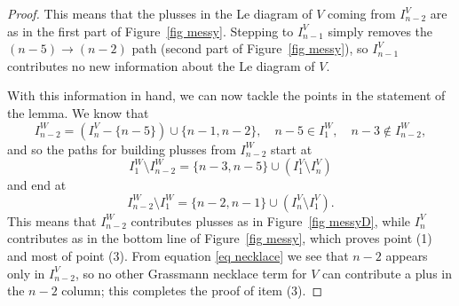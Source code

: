 \documentclass[11pt]{article}
\theoremstyle{remark}
\theoremstyle{definition}
\begin{document}
\begin{proof}
  This means that the plusses in the Le diagram of $V$ coming from $I_{n-2}^{V}$ are as in the first part of Figure~\ref{fig messy}.  Stepping to $I_{n-1}^{V}$ simply removes the $(n-5)\rightarrow (n-2)$ path (second part of Figure~\ref{fig messy}), so $I_{n-1}^V$ contributes no new information about the Le diagram of $V$.


  With this information in hand, we can now tackle the points in the statement of the lemma. We know that 
  \[I_{n-2}^{W}  = (I_{n}^{V} - \{n-5\})\cup \{n-1,n-2\}, \quad n-5 \in I_1^W, \quad n-3\not\in I_{n-2}^W,\]
 and so the paths for building plusses from $I_{n-2}^{W}$ start at
 \[I_1^W \setminus I_{n-2}^W = \{n-3,n-5\} \cup (I_1^V \setminus I_n^V)\]
 and end at
 \[I_{n-2}^W \setminus I_1^W = \{n-2,n-1\}\cup(I_n^V \setminus I_1^V).\]
This means that $I_{n-2}^W$ contributes plusses as in Figure~\ref{fig messyD}, while $I_n^V$ contributes as in the bottom line of Figure~\ref{fig messy}, which proves point (1) and most of point (3). From equation \eqref{eq necklace} we see that $n-2$ appears only in $I_{n-2}^V$, so no other Grassmann necklace term for $V$ can contribute a plus in the $n-2$ column; this completes the proof of item (3).


\end{proof}
\end{document}
